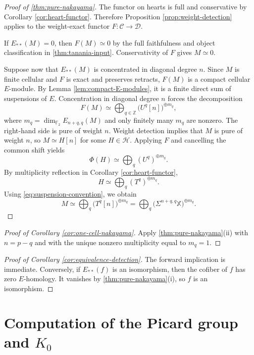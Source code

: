 \documentclass[11pt]{amsart}
\numberwithin{equation}{section}
\theoremstyle{definition}
\theoremstyle{remark}
\newcommand{\F}{\mathbb F_2}
\newcommand{\X}{\mathbb X}
\newcommand{\C}{\mathcal C}
\newcommand{\D}{\mathcal D}
\newcommand{\Hh}{\mathcal H}
\begin{document}
\begin{proof}[Proof of \cref{thm:pure-nakayama}]
The functor on hearts is full and conservative by Corollary 
\ref{cor:heart-functor}.  Therefore Proposition  \ref{prop:weight-detection} applies to
the weight-exact functor $F\colon\C\to\D$.

If $E_{**}(M)=0$, then $F(M)\simeq0$ by the full faithfulness and object
classification in \cref{thm:tanania-input}.  Conservativity of $F$ gives
$M\simeq0$.

Suppose now that $E_{**}(M)$ is concentrated in diagonal degree $n$.  Since
$M$ is finite cellular and $F$ is exact and preserves retracts, $F(M)$ is a
compact cellular $E$-module.  By Lemma  \ref{lem:compact-E-modules}, it is a finite
direct sum of suspensions of $E$.  Concentration in diagonal degree $n$
forces the decomposition
\[
  F(M)\simeq
  \bigoplus_{q\in\mathbb Z}
  \bigl(U^q[n]\bigr)^{\oplus m_q},
\]
where $m_q=\dim_{\F}E_{n+q,q}(M)$ and only finitely many $m_q$ are nonzero.
The right-hand side is pure of weight $n$.  Weight detection implies that
$M$ is pure of weight $n$, so
 $M\simeq H[n]$
for some $H\in\Hh$.  Applying $F$ and cancelling the common shift yields
\[
  \Phi(H)\simeq
  \bigoplus_q(U^q)^{\oplus m_q}.
\]
By multiplicity reflection in Corollary  \ref{cor:heart-functor},
\[
  H\simeq\bigoplus_q(T^q)^{\oplus m_q}.
\]
Using \eqref{eq:suspension-convention}, we obtain
\[
  M\simeq
  \bigoplus_q\bigl(T^q[n]\bigr)^{\oplus m_q}
  =
  \bigoplus_q
  \bigl(\Sigma^{n+q,q}\X\bigr)^{\oplus m_q}.
\]
\end{proof}

\begin{proof}[Proof of Corollary \ref{cor:one-cell-nakayama}]
Apply \cref{thm:pure-nakayama}(ii) with $n=p-q$ and with the unique nonzero
multiplicity equal to $m_q=1$.
\end{proof}

\begin{proof}[Proof of Corollary \ref{cor:equivalence-detection}]
The forward implication is immediate.  Conversely, if $E_{**}(f)$ is an
isomorphism, then the cofiber of $f$ has zero $E$-homology.  It vanishes by
\cref{thm:pure-nakayama}(i), so $f$ is an isomorphism.
\end{proof}



\section{Computation of the Picard group and $K_0$}\label{sec:picard}
\end{document}
